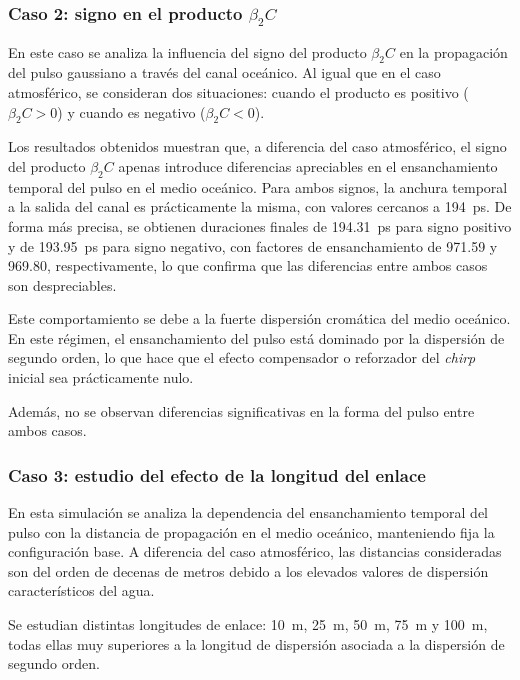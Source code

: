 \subsubsection*{Caso 2: signo en el producto $\beta_{2}C$}

En este caso se analiza la influencia del signo del producto $\beta_{2}C$ en la propagación del pulso gaussiano a través del canal oceánico. Al igual que en el caso atmosférico, se consideran dos situaciones: cuando el producto es positivo ($\beta_{2}C > 0$) y cuando es negativo ($\beta_{2}C < 0$).

Los resultados obtenidos muestran que, a diferencia del caso atmosférico, el signo del producto $\beta_{2}C$ apenas introduce diferencias apreciables en el ensanchamiento temporal del pulso en el medio oceánico. Para ambos signos, la anchura temporal a la salida del canal es prácticamente la misma, con valores cercanos a \SI{194}{\pico\second}. De forma más precisa, se obtienen duraciones finales de \SI{194.31}{\pico\second} para signo positivo y de \SI{193.95}{\pico\second} para signo negativo, con factores de ensanchamiento de 971.59 y 969.80, respectivamente, lo que confirma que las diferencias entre ambos casos son despreciables.

Este comportamiento se debe a la fuerte dispersión cromática del medio oceánico. En este régimen, el ensanchamiento del pulso está dominado por la dispersión de segundo orden, lo que hace que el efecto compensador o reforzador del \textit{chirp} inicial sea prácticamente nulo.

Además, no se observan diferencias significativas en la forma del pulso entre ambos casos.
 

\subsubsection*{Caso 3: estudio del efecto de la longitud del enlace}

En esta simulación se analiza la dependencia del ensanchamiento temporal del pulso con la distancia de propagación en el medio oceánico, manteniendo fija la configuración base. A diferencia del caso atmosférico, las distancias consideradas son del orden de decenas de metros debido a los elevados valores de dispersión característicos del agua.

Se estudian distintas longitudes de enlace: \SI{10}{\meter}, \SI{25}{\meter}, \SI{50}{\meter}, \SI{75}{\meter} y \SI{100}{\meter}, todas ellas muy superiores a la longitud de dispersión asociada a la dispersión de segundo orden.

